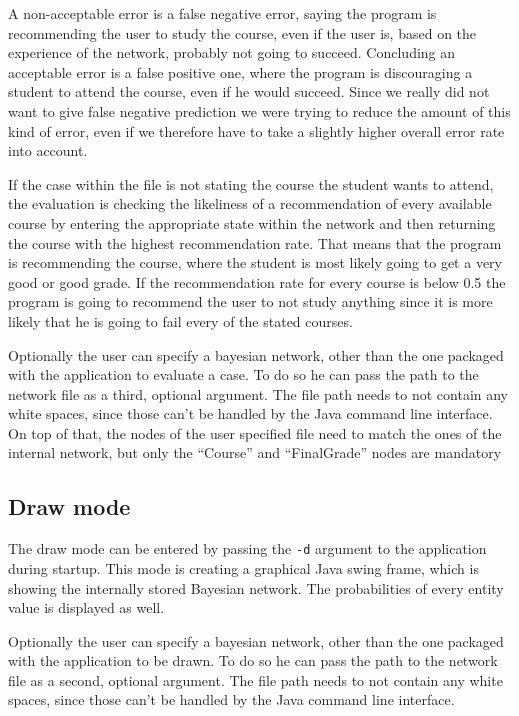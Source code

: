 \documentclass[%
	pdftex,
	oneside,        %
	11pt,           %
	parskip=half,   %
	headsepline,    %
	footsepline,    %
	abstracton,     %
	USenglish,      %
	a4paper,        %
]{report}
\begin{document}
A non-acceptable error is a false negative error, saying the program is recommending the user to study the course, even if the user is, based on the experience of the network, probably not going to succeed. Concluding an acceptable error is a false positive one, where the program is discouraging a student to attend the course, even if he would succeed. Since we really did not want to give false negative prediction we were trying to reduce the amount of this kind of error, even if we therefore have to take a slightly higher overall error rate into account.

If the case within the file is not stating the course the student wants to attend, the evaluation is checking the likeliness of a recommendation of every available course by entering the appropriate state within the network and then returning the course with the highest recommendation rate. That means that the program is recommending the course, where the student is most likely going to get a very good or good grade. If the recommendation rate for every course is below 0.5 the program is going to recommend the user to not study anything since it is more likely that he is going to fail every of the stated courses.

Optionally the user can specify a bayesian network, other than the one packaged with the application to evaluate a case. To do so he can pass the path to the network file as a third, optional argument. The file path needs to not contain any white spaces, since those can't be handled by the Java command line interface. On top of that, the nodes of the user specified file need to match the ones of the internal network, but only the \enquote{Course} and \enquote{FinalGrade} nodes are mandatory

\subsection{Draw mode}
The draw mode can be entered by passing the \texttt{-d} argument to the application during startup. This mode is creating a graphical Java swing frame, which is showing the internally stored Bayesian network. The probabilities of every entity value is displayed as well.

Optionally the user can specify a bayesian network, other than the one packaged with the application to be drawn. To do so he can pass the path to the network file as a second, optional argument. The file path needs to not contain any white spaces, since those can't be handled by the Java command line interface.
\end{document}
